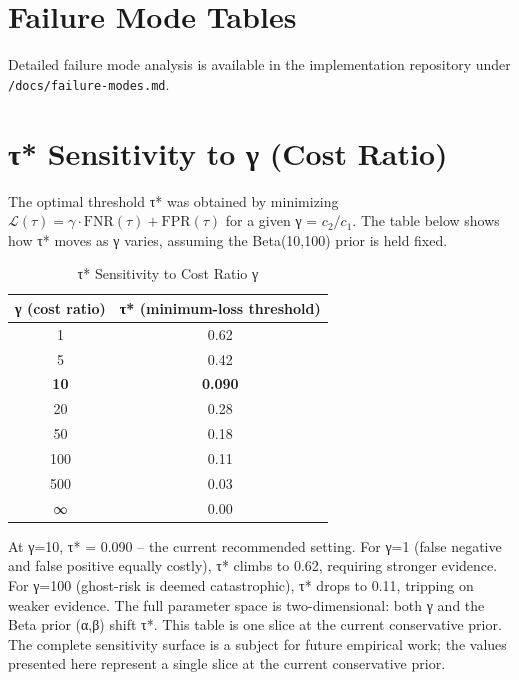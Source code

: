 \documentclass[10pt,conference]{IEEEtran}
\begin{document}
\section{Failure Mode Tables}
\label{app:failure_modes}

Detailed failure mode analysis is available in the implementation repository under \texttt{/docs/failure-modes.md}.

\section{τ* Sensitivity to γ (Cost Ratio)}
\label{app:tau_sensitivity}

The optimal threshold τ* was obtained by minimizing \(\mathcal{L}(\tau) = \gamma \cdot \text{FNR}(\tau) + \text{FPR}(\tau)\) for a given γ = \(c_2/c_1\). The table below shows how τ* moves as γ varies, assuming the Beta(10,100) prior is held fixed.

\begin{table}[H]
\centering
\caption{τ* Sensitivity to Cost Ratio γ}
\label{tab:tau_sensitivity}
\begin{tabular}{@{}cc@{}}
\toprule
γ (cost ratio) & τ* (minimum-loss threshold) \\
\midrule
1              & 0.62                        \\
5              & 0.42                        \\
\textbf{10}    & \textbf{0.090}              \\
20             & 0.28                        \\
50             & 0.18                        \\
100            & 0.11                        \\
500            & 0.03                        \\
∞              & 0.00                        \\
\bottomrule
\end{tabular}
\end{table}

At γ=10, τ* = 0.090 – the current recommended setting.
For γ=1 (false negative and false positive equally costly), τ* climbs to 0.62, requiring stronger evidence.
For γ=100 (ghost-risk is deemed catastrophic), τ* drops to 0.11, tripping on weaker evidence.
The full parameter space is two-dimensional: both γ and the Beta prior (α,β) shift τ*. This table is one slice at the current conservative prior. The complete sensitivity surface is a subject for future empirical work; the values presented here represent a single slice at the current conservative prior.
\end{document}
